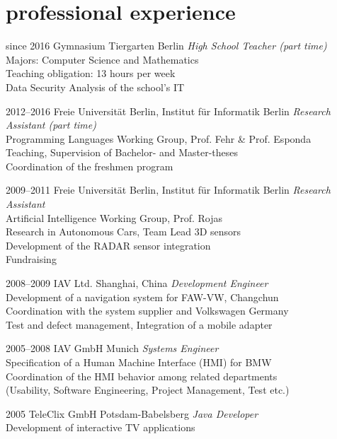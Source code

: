 \documentclass[]{friggeri-cv} %
\begin{document}
\section{professional experience}

\begin{entrylist}

\entry
{since 2016}
{Gymnasium Tiergarten}
{Berlin}
{\emph{High School Teacher (part time)}\\
Majors: Computer Science and Mathematics\\
Teaching obligation: 13 hours per week\\
Data Security Analysis of the school's IT
}

\entry
{2012--2016}
{Freie Universität Berlin, Institut für Informatik}
{Berlin}
{\emph{Research Assistant (part time)}\\
Programming Languages Working Group, Prof. Fehr \& Prof. Esponda\\
Teaching, Supervision of Bachelor- and Master-theses\\
Coordination of the freshmen program
}

\entry
{2009--2011}
{Freie Universität Berlin, Institut für Informatik}
{Berlin}
{\emph{Research Assistant}\\
Artificial Intelligence Working Group, Prof. Rojas\\
Research in Autonomous Cars, Team Lead 3D sensors\\
Development of the RADAR sensor integration\\
Fundraising
}

\entry
{2008--2009}
{IAV Ltd.}
{Shanghai, China}
{\emph{Development Engineer}\\
Development of a navigation system for FAW-VW, Changchun\\
Coordination with the system supplier and Volkswagen Germany\\
Test and defect management, Integration of a mobile adapter
}

\entry
{2005--2008}
{IAV GmbH}
{Munich}
{\emph{Systems Engineer}\\
Specification of a Human Machine Interface (HMI) for BMW\\
Coordination of the HMI behavior among related departments\\
  (Usability, Software Engineering, Project Management, Test etc.)
}

\entry
{2005}
{TeleClix GmbH}
{Potsdam-Babelsberg}
{\emph{Java Developer}\\
Development of interactive TV applications
}

\end{entrylist}
\end{document}
